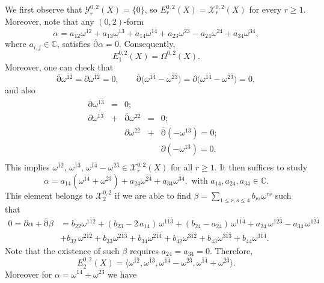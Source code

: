 \documentclass[a4paper]{amsart}
\theoremstyle{definition}
\theoremstyle{remark}
\newcommand{\db}{\operatorname{\overline{\partial}}}
\numberwithin{equation}{section}
\begin{document}
We first observe that ${\mathcal Y}^{0,2}_r(X)=\{0\}$, so $E^{0,2}_r(X)={\mathcal X}^{0,2}_r(X)$ for every $r\geq 1$. Moreover, note that any $(0,2)$-form
$$\alpha=a_{12}\omega^{\bar1\bar2}+a_{13}\omega^{\bar1\bar3}+a_{14}\omega^{\bar1\bar4}
+a_{23}\omega^{\bar2\bar3}-a_{24}\omega^{\bar2\bar4}+a_{34}\omega^{\bar3\bar4},$$
where $a_{i,j}\in\mathbb C$, satisfies $\db\alpha=0$. Consequently, 
$$E^{0,2}_1(X)=\Omega^{0,2}(X).$$ 
Moreover, one can check that 
$$\db\omega^{\bar1\bar2}=\partial \omega^{\bar1\bar2}=0,\qquad
\db\big(\omega^{\bar1\bar4}-\omega^{\bar2\bar3}\big)=
\partial(\omega^{\bar1\bar4}-\omega^{\bar2\bar3}\big)=0,$$
and also
\begin{equation*}
\begin{array}{llllll}
\db \omega^{\bar1\bar3} &=& 0;&&&\\[5pt]
\partial \omega^{\bar1\bar3} &+& \db \omega^{2\bar2} &=& 0;&\\[5pt]
 & & \partial \omega^{2\bar2} &+& \db (-\omega^{13})=  0;\\[5pt]
 & & & & \partial (-\omega^{13})=  0.\\
\end{array}
\end{equation*}
This implies $\omega^{\bar1\bar2}$, $\omega^{\bar1\bar3}$, $\omega^{\bar1\bar4}-\omega^{\bar2\bar3}\in\mathcal{X}^{0,2}_{r}(X)$ for all $r\geq 1$. It then suffices to study
$$\alpha=a_{14}(\omega^{\bar1\bar4}+\omega^{\bar2\bar3})+a_{24}\omega^{\bar2\bar4}
+a_{34}\omega^{\bar3\bar4}, \text{ with }a_{14}, a_{24}, a_{34}\in\mathbb C.$$ 
This element belongs to $\mathcal X^{0,2}_2$ if we are able to find $\beta=\sum_{1\leq r,s\leq 4}b_{rs}\omega^{r\bar s}$ such that
\begin{equation*}
\begin{split}
0=\partial\alpha+\db\beta &=b_{22}\omega^{1\bar1\bar2}+(b_{23}-2\,a_{14})\,\omega^{1\bar1\bar3}
	+(b_{24}-a_{24})\,\omega^{1\bar1\bar4}+a_{24}\,\omega^{1\bar2\bar3}
	-a_{34}\,\omega^{1\bar2\bar4}\\
& +b_{32}\,\omega^{2\bar1\bar2}+b_{33}\omega^{2\bar1\bar3}+b_{34}\omega^{2\bar1\bar4}
	+b_{42}\omega^{3\bar1\bar2}+b_{43}\omega^{3\bar1\bar3}+b_{44}\omega^{3\bar1\bar4}.
\end{split}
\end{equation*}
Note that the existence of such $\beta$ requires $a_{24}=a_{34}=0$. Therefore, 
$$E_2^{0,2}(X)=\langle \omega^{\bar1\bar2},\omega^{\bar1\bar3}, \omega^{\bar1\bar4}-\omega^{\bar2\bar3}, \omega^{\bar1\bar4}+\omega^{\bar2\bar3}\rangle.$$
Moreover for $\alpha=\omega^{\bar1\bar4}+\omega^{\bar2\bar3}$ we have
\end{document}
